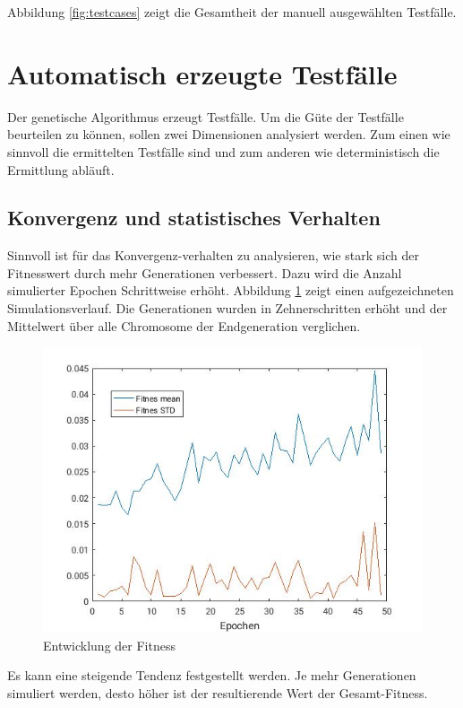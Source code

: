 \documentclass[12pt,a4paper]{article}
\begin{document}
Abbildung \ref{fig:testcases} zeigt die Gesamtheit der manuell ausgewählten Testfälle.

\section{Automatisch erzeugte Testfälle}
Der genetische Algorithmus erzeugt Testfälle. Um die Güte der Testfälle beurteilen zu können, sollen zwei Dimensionen analysiert werden. Zum einen wie sinnvoll die ermittelten Testfälle sind und zum anderen wie deterministisch die Ermittlung abläuft.

\subsection{Konvergenz und statistisches Verhalten}
Sinnvoll ist für das Konvergenz-verhalten zu analysieren, wie stark sich der Fitnesswert durch mehr Generationen verbessert.
Dazu wird die Anzahl simulierter Epochen Schrittweise erhöht. Abbildung \ref{fig:epochen} zeigt einen aufgezeichneten Simulationsverlauf. Die Generationen wurden in Zehnerschritten erhöht und der Mittelwert über alle Chromosome der Endgeneration verglichen.
\begin{figure}\centering
\includegraphics[width=.6\textwidth]{increasedEpochs.jpg}
\caption{Entwicklung der Fitness}
\label{fig:epochen}
\end{figure}
Es kann eine steigende Tendenz festgestellt werden. Je mehr Generationen simuliert werden, desto höher ist der resultierende Wert der Gesamt-Fitness.
\end{document}
